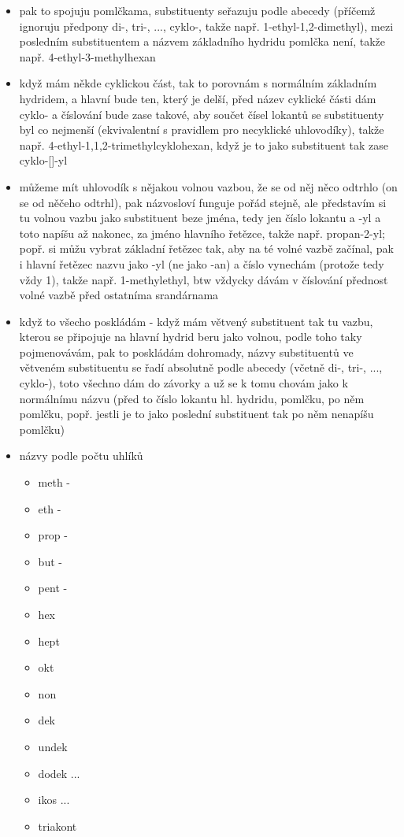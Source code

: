 \documentclass{article}
\begin{document}
\begin{itemize}
\begin{itemize}
\begin{itemize}
      \item pak to spojuju pomlčkama, substituenty seřazuju podle abecedy (příčemž ignoruju předpony di-, tri-, ..., cyklo-, takže např. 1-ethyl-1,2-dimethyl), mezi posledním substituentem a názvem základního hydridu pomlčka není, takže např. 4-ethyl-3-methylhexan
      \item když mám někde cyklickou část, tak to porovnám s normálním základním hydridem, a hlavní bude ten, který je delší, před název cyklické části dám cyklo- a číslování bude zase takové, aby součet čísel lokantů se substituenty byl co nejmenší (ekvivalentní s pravidlem pro necyklické uhlovodíky), takže např. 4-ethyl-1,1,2-trimethylcyklohexan, když je to jako substituent tak zase cyklo-[]-yl
      \item můžeme mít uhlovodík s nějakou volnou vazbou, že se od něj něco odtrhlo (on se od něčeho odtrhl), pak názvosloví funguje pořád stejně, ale představím si tu volnou vazbu jako substituent beze jména, tedy jen číslo lokantu a -yl a toto napíšu až nakonec, za jméno hlavního řetězce, takže např. propan-2-yl; popř. si můžu vybrat základní řetězec tak, aby na té volné vazbě začínal, pak i hlavní řetězec nazvu jako -yl (ne jako -an) a číslo vynechám (protože tedy vždy 1), takže např. 1-methylethyl, btw vždycky dávám v číslování přednost volné vazbě před ostatníma srandárnama
      \item když to všecho poskládám - když mám větvený substituent tak tu vazbu, kterou se připojuje na hlavní hydrid beru jako volnou, podle toho taky pojmenovávám, pak to poskládám dohromady, názvy substituentů ve větveném substituentu se řadí absolutně podle abecedy (včetně di-, tri-, ..., cyklo-), toto všechno dám do závorky a už se k tomu chovám jako k normálnímu názvu (před to číslo lokantu hl. hydridu, pomlčku, po něm pomlčku, popř. jestli je to jako poslední substituent tak po něm nenapíšu pomlčku)
      \item názvy podle počtu uhlíků
      \begin{itemize}
        \item meth -
        \item eth  -
        \item prop -
        \item but -
        \item pent -
        \item hex
        \item hept
        \item okt
        \item non
        \item dek
        \item undek
        \item dodek
        ...
        \item ikos
        ...
        \item triakont
      \end{itemize}
    \end{itemize}
  \end{itemize}
\end{itemize}
\end{document}
